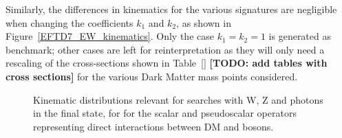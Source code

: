 Similarly, the differences in kinematics for the various signatures 
are negligible when changing the coefficients $k_1$ and $k_2$, as shown
in Figure~\ref{EFTD7_EW_kinematics}. Only the case $k_1=k_2=1$ is generated as benchmark; 
other cases are left for reinterpretation as they will only need a rescaling of the cross-sections
shown in Table~\ref{} \textbf{[TODO: add tables with cross sections]} for the various Dark Matter
mass points considered. 

\begin{figure}[h!]
  \centering  
    \hfill
    \caption{Kinematic distributions relevant for searches with W, Z and photons in the final state, 
    for for the scalar and pseudoscalar operators representing direct interactions between DM and bosons.}
    \label{fig:EFTD7_EW_kinematics}
    
\end{figure}

